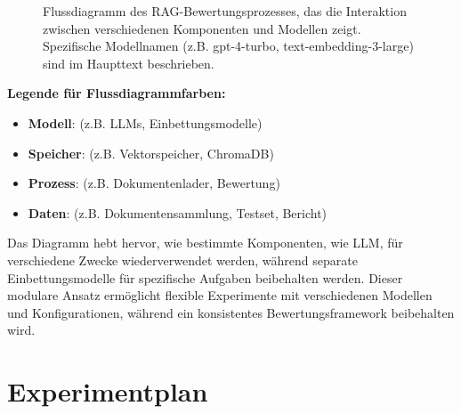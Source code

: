 \begin{figure}[htbp]
{
    }
    \caption{Flussdiagramm des RAG-Bewertungsprozesses, das die Interaktion zwischen verschiedenen Komponenten und Modellen zeigt. Spezifische Modellnamen (z.B. gpt-4-turbo, text-embedding-3-large) sind im Haupttext beschrieben.}
    \label{fig:rag-flow}
\end{figure}

\begin{center}
\begin{minipage}{0.85\textwidth}
\textbf{Legende für Flussdiagrammfarben:}
\begin{itemize}
    \item \colorbox{pink!20}{\strut\hspace{1.5em}} \textbf{Modell}: (z.B. LLMs, Einbettungsmodelle)
    \item \colorbox{blue!20}{\strut\hspace{1.5em}} \textbf{Speicher}: (z.B. Vektorspeicher, ChromaDB)
    \item \colorbox{green!20}{\strut\hspace{1.5em}} \textbf{Prozess}: (z.B. Dokumentenlader, Bewertung)
    \item \colorbox{red!20}{\strut\hspace{1.5em}} \textbf{Daten}: (z.B. Dokumentensammlung, Testset, Bericht)
\end{itemize}
\end{minipage}
\end{center}

Das Diagramm hebt hervor, wie bestimmte Komponenten, wie LLM, für verschiedene Zwecke wiederverwendet werden, während separate Einbettungsmodelle für spezifische Aufgaben beibehalten werden. Dieser modulare Ansatz ermöglicht flexible Experimente mit verschiedenen Modellen und Konfigurationen, während ein konsistentes Bewertungsframework beibehalten wird.

\section{Experimentplan}

